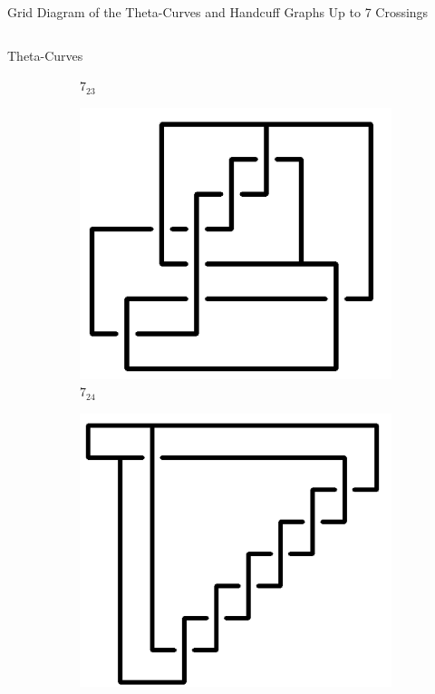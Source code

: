 \documentclass[final]{beamer}
\begin{document}
\begin{frame}[t]
\begin{alertblock}{Grid Diagram of the Theta-Curves and Handcuff Graphs Up to 7 Crossings}
\begin{columns}[t]
\begin{column}{0.5\textwidth}
\begin{alertblock}{Theta-Curves}
\begin{figure}
\begin{subfigure}{0.075\textwidth}
    \caption{$7_{23}$} 
    \end{subfigure}
    \begin{subfigure}{0.075\textwidth}
    \includegraphics[width=\columnwidth]{../Midterm_Poster/grid_diagram/theta_7_24.png}
    \caption{$7_{24}$} 
    \end{subfigure}
    \begin{subfigure}{0.075\textwidth}
    \includegraphics[width=\columnwidth]{../Midterm_Poster/grid_diagram/theta_7_25.png}

\end{subfigure}
\end{figure}
\end{alertblock}
\end{column}
\end{columns}
\end{alertblock}
\end{frame}
\end{document}

